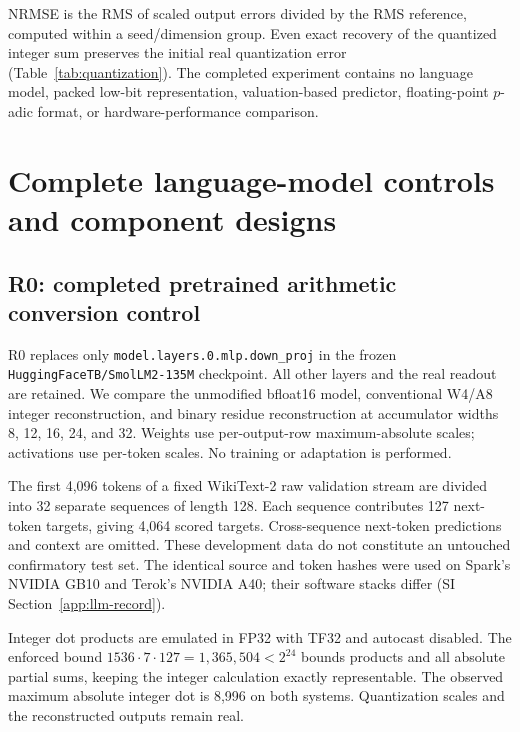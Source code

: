 \documentclass[11pt]{article}
\begin{document}
NRMSE is the RMS of scaled output errors divided by the RMS reference,
computed within a seed/dimension group. Even exact recovery of the quantized
integer sum preserves the initial real quantization error
(Table~\ref{tab:quantization}). The completed experiment contains no
language model, packed low-bit representation, valuation-based predictor,
floating-point \(p\)-adic format, or hardware-performance comparison.


\section{Complete language-model controls and component designs}
\label{si:components}

\subsection{R0: completed pretrained arithmetic conversion control}

R0 replaces only \texttt{model.\allowbreak{}layers.\allowbreak{}0.\allowbreak{}mlp.\allowbreak{}down\_\allowbreak{}proj} in the frozen
\texttt{HuggingFaceT\allowbreak{}B/\allowbreak{}SmolLM2-\allowbreak{}135M} checkpoint. All other layers and the real
readout are retained. We compare the unmodified bfloat16 model, conventional
W4/A8 integer reconstruction, and binary residue reconstruction at accumulator
widths 8, 12, 16, 24, and 32. Weights use per-output-row maximum-absolute scales;
activations use per-token scales. No training or adaptation is performed.

The first 4,096 tokens of a fixed WikiText-2 raw validation stream are divided
into 32 separate sequences of length 128. Each sequence contributes 127
next-token targets, giving 4,064 scored targets. Cross-sequence next-token
predictions and context are omitted. These development data do not constitute
an untouched confirmatory test set. The identical source and token hashes
were used on Spark's NVIDIA GB10 and Terok's NVIDIA A40; their software stacks
differ (SI Section~\ref{app:llm-record}).

Integer dot products are emulated in FP32 with TF32 and autocast disabled.
The enforced bound \(1536\cdot7\cdot127=1{,}365{,}504<2^{24}\) bounds products
and all absolute partial sums, keeping the integer calculation exactly
representable. The observed maximum absolute integer dot is 8,996 on both
systems. Quantization scales and the reconstructed outputs remain real.
\end{document}
